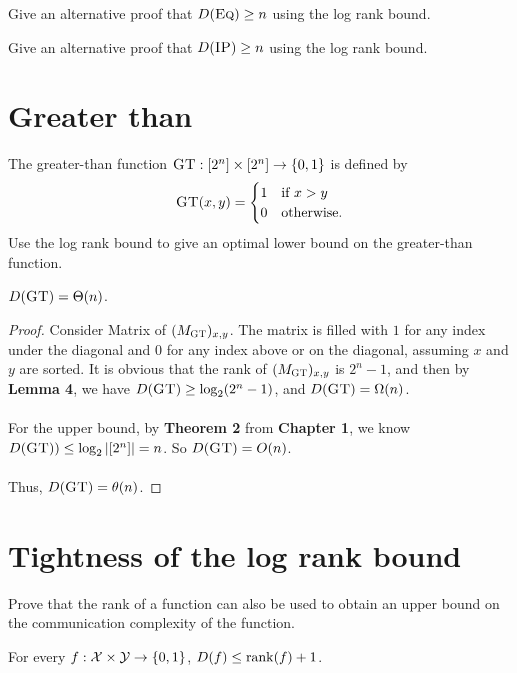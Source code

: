 \exercises

\begin{exercise} %
	Give an alternative proof that $D(\textsc{Eq}) \ge n$ using the log rank bound.
\end{exercise}

\begin{exercise}
	Give an alternative proof that $D(\textsc{IP}) \ge n$ using the log rank bound.\end{exercise}


\section{Greater than}

The greater-than function $\textsc{GT} : [2^n] \times [2^n] \to \{0,1\}$ is defined by
\[
\textsc{GT}(x,y) = \begin{cases}
1 & \mbox{if } x > y \\
0 & \mbox{otherwise.}
\end{cases}
\]
Use the log rank bound to give an optimal lower bound on the greater-than function.

\begin{theorem}
	$D(\textsc{GT}) = \Theta(n)$.
\end{theorem}

\begin{proof}
	Consider Matrix of \GT $(M_{\textsc{GT}})_{x,y}$. The matrix is filled with $1$ for any index under the diagonal and $0$ for any index above or on the diagonal, assuming $x$ and $y$ are sorted. It is obvious that the rank of $(M_{\textsc{GT}})_{x,y}$ is $2^n-1$, and then by \textbf{Lemma 4}, we have $D(\textsc{GT}) \ge \log_2 (2^n-1)$, and $D(\textsc{GT}) = \Omega(n)$.\\
	\\
	For the upper bound, by \textbf{Theorem 2} from \textbf{Chapter 1}, we know $D(\textsc{GT})) \leq \log_2 |[2^n]| = n$. So $D(\textsc{GT}) = O(n)$. \\
	\\
	Thus, $D(\textsc{GT}) = \theta(n)$.
\end{proof}



\section{Tightness of the log rank bound}

Prove that the rank of a function can also be used to obtain an upper bound on the communication complexity of the function.

\begin{theorem}
	For every $f : \mathcal{X} \times \mathcal{Y} \to \{0,1\}$, $D(f) \le \mathrm{rank}(f) + 1$.
\end{theorem}

